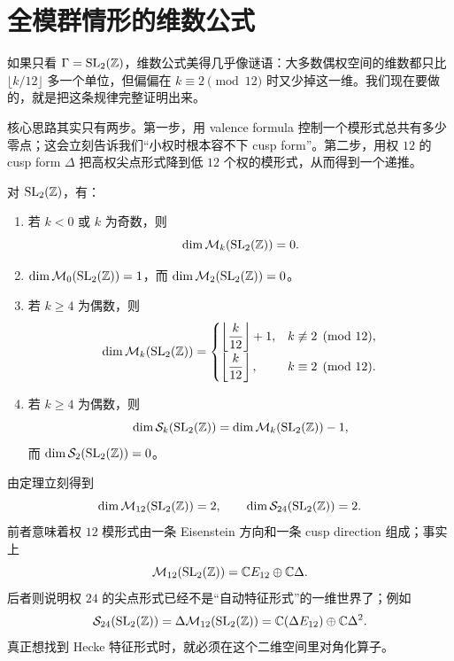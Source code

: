 \section{全模群情形的维数公式}
\label{sec:dim-sl2z}

如果只看 $\Gamma=\mathrm{SL}_2(\mathbb{Z})$，维数公式美得几乎像谜语：大多数偶权空间的维数都只比 $\lfloor k/12\rfloor$ 多一个单位，但偏偏在 $k\equiv 2\pmod{12}$ 时又少掉这一维。我们现在要做的，就是把这条规律完整证明出来。

核心思路其实只有两步。第一步，用 valence formula 控制一个模形式总共有多少零点；这会立刻告诉我们“小权时根本容不下 cusp form”。第二步，用权 $12$ 的 cusp form $\Delta$ 把高权尖点形式降到低 $12$ 个权的模形式，从而得到一个递推。



\begin{theorem}[全模群的维数公式]
\label{thm:dim-sl2z}
对 $\mathrm{SL}_2(\mathbb{Z})$，有：
\begin{enumerate}
  \item 若 $k<0$ 或 $k$ 为奇数，则
        \[
          \dim \mathcal{M}_k(\mathrm{SL}_2(\mathbb{Z}))=0.
        \]
  \item $\dim \mathcal{M}_0(\mathrm{SL}_2(\mathbb{Z}))=1$，而 $\dim \mathcal{M}_2(\mathrm{SL}_2(\mathbb{Z}))=0$。
  \item 若 $k\ge 4$ 为偶数，则
        \[
          \dim \mathcal{M}_k(\mathrm{SL}_2(\mathbb{Z}))=
          \begin{cases}
            \left\lfloor\dfrac{k}{12}\right\rfloor+1,& k\not\equiv 2 \pmod{12},\\[6pt]
            \left\lfloor\dfrac{k}{12}\right\rfloor,& k\equiv 2 \pmod{12}.
          \end{cases}
        \]
  \item 若 $k\ge 4$ 为偶数，则
        \[
          \dim \mathcal{S}_k(\mathrm{SL}_2(\mathbb{Z}))=\dim \mathcal{M}_k(\mathrm{SL}_2(\mathbb{Z}))-1,
        \]
        而 $\dim \mathcal{S}_2(\mathrm{SL}_2(\mathbb{Z}))=0$。
\end{enumerate}
\end{theorem}

\begin{example}[先看两个最重要的数]
\label{ex:dim-m12-s24}
由定理立刻得到
\[
  \dim \mathcal{M}_{12}(\mathrm{SL}_2(\mathbb{Z}))=2,
  \qquad
  \dim \mathcal{S}_{24}(\mathrm{SL}_2(\mathbb{Z}))=2.
\]
前者意味着权 $12$ 模形式由一条 Eisenstein 方向和一条 cusp direction 组成；事实上
\[
  \mathcal{M}_{12}(\mathrm{SL}_2(\mathbb{Z}))=\mathbb{C} E_{12}\oplus \mathbb{C}\Delta.
\]
后者则说明权 $24$ 的尖点形式已经不是“自动特征形式”的一维世界了；例如
\[
  \mathcal{S}_{24}(\mathrm{SL}_2(\mathbb{Z}))=\Delta\mathcal{M}_{12}(\mathrm{SL}_2(\mathbb{Z}))
  =\mathbb{C}(\Delta E_{12})\oplus \mathbb{C}\Delta^2.
\]
真正想找到 Hecke 特征形式时，就必须在这个二维空间里对角化算子。
\end{example}

